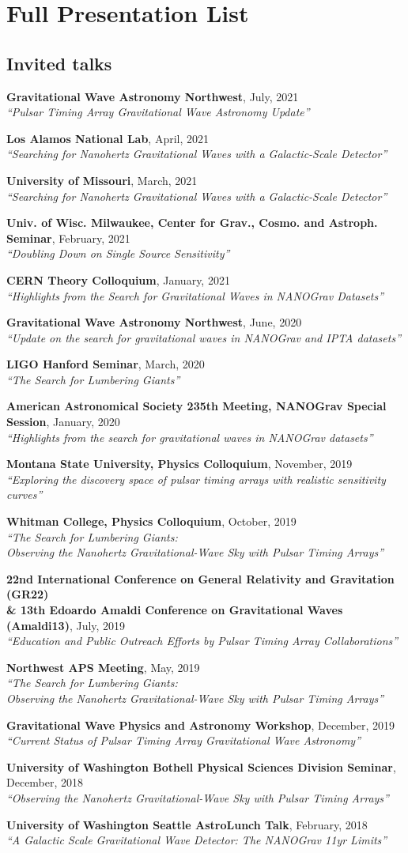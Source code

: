 \documentclass[11pt,letterpaper,sans,unicode]{moderncv}
\newcommand{\invtalkitem}[3]{\item \textbf{#1}, \hfill{#2} \\ \textit{\color{color1}``#3''} \vspace{-0.1cm}} %
\begin{document}
\section{Full Presentation List}
\subsection{Invited talks} %
\renewcommand\labelenumi{\bfseries\theenumi .}

\begin{etaremune}[leftmargin=8mm]
\small
\invtalkitem{Gravitational Wave Astronomy Northwest}{July, 2021}{Pulsar Timing Array Gravitational Wave Astronomy Update}
\invtalkitem{Los Alamos National Lab}{April, 2021}{Searching for Nanohertz Gravitational Waves with a Galactic-Scale Detector}
\invtalkitem{University of Missouri}{March, 2021}{Searching for Nanohertz Gravitational Waves with a Galactic-Scale Detector}
\invtalkitem{Univ. of Wisc. Milwaukee, Center for Grav., Cosmo. and Astroph. Seminar}{February, 2021}{Doubling Down on Single Source Sensitivity}
\invtalkitem{CERN Theory Colloquium}{January, 2021}{Highlights from the Search for Gravitational Waves in NANOGrav Datasets}
\invtalkitem{Gravitational Wave Astronomy Northwest}{June, 2020}{Update on the search for gravitational waves in NANOGrav and IPTA datasets}
\invtalkitem{LIGO Hanford Seminar}{March, 2020}{The Search for Lumbering Giants}
\invtalkitem{American Astronomical Society 235th Meeting, NANOGrav Special Session}{January, 2020}{Highlights from the search for gravitational waves in NANOGrav datasets}
\invtalkitem{Montana State University, Physics Colloquium}{November, 2019}{Exploring the discovery space of pulsar timing arrays with realistic sensitivity curves}
\invtalkitem{Whitman College, Physics Colloquium}{October, 2019}{The Search for Lumbering Giants:\\ Observing the Nanohertz Gravitational-Wave Sky with Pulsar Timing Arrays}
\invtalkitem{22nd International Conference on General Relativity and Gravitation (GR22)\\ \& 13th Edoardo Amaldi Conference on Gravitational Waves (Amaldi13)}{July, 2019}{Education and Public Outreach Efforts by Pulsar Timing Array Collaborations}
\invtalkitem{Northwest APS Meeting}{May, 2019}{The Search for Lumbering Giants:\\Observing the Nanohertz Gravitational-Wave Sky with Pulsar Timing Arrays}
\invtalkitem{Gravitational Wave Physics and Astronomy Workshop}{December, 2019}{Current Status of Pulsar Timing Array Gravitational Wave Astronomy}
\invtalkitem{University of Washington Bothell Physical Sciences Division Seminar}{December, 2018}{Observing the Nanohertz Gravitational-Wave Sky with Pulsar Timing Arrays}
\invtalkitem{University of Washington Seattle AstroLunch Talk}{February, 2018}{A Galactic Scale Gravitational Wave Detector: The NANOGrav 11yr Limits}


\end{etaremune}
\end{document}
